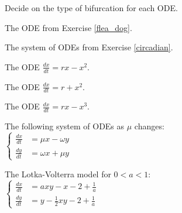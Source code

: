 \begin{slide}


Decide on the type of bifurcation for each ODE.

\begin{parts}
	\item The ODE from Exercise \ref{flea_dog}.
	\item The system of ODEs from Exercise \ref{circadian}.
	\item The ODE $\frac{dx}{dt} = rx - x^2$.
	\item The ODE $\frac{dx}{dt} = r + x^2$.
	\item The ODE $\frac{dx}{dt} = rx - x^3$.
	\item The following system of ODEs as $\mu$ changes: \\
	$ \begin{cases}
 		\frac{dx}{dt} & = \mu x -  \omega y \\[5pt]
 		\frac{dy}{dt} & = \omega x + \mu y
	\end{cases}
	$
	\item The Lotka-Volterra model for $0< a < 1$: \\
	$ \begin{cases}
 		\frac{dx}{dt} & = a xy - x - 2 + \frac1a\\[5pt]
 		\frac{dy}{dt} & = y - \frac12 xy - 2 + \frac1a
	\end{cases}
	$
\end{parts}
	
	
\end{slide}


